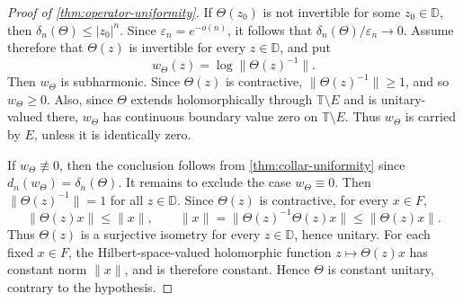 \documentclass[11pt]{amsart}
\numberwithin{equation}{section}
\theoremstyle{definition}
\newcommand{\D}{\mathbb D}
\newcommand{\T}{\mathbb T}
\newcommand{\eps}{\varepsilon}
\begin{document}
\begin{proof}[Proof of \cref{thm:operator-uniformity}]
If $\Theta(z_0)$ is not invertible for some $z_0\in\D$, then
$\delta_n(\Theta)\le |z_0|^n$.  Since $\eps_n=e^{-o(n)}$, it follows that
$\delta_n(\Theta)/\eps_n\to0$.
Assume therefore that $\Theta(z)$ is invertible for every $z\in\D$, and
put
$$
        w_\Theta(z)=\log\|\Theta(z)^{-1}\|.
$$
Then $w_\Theta$ is subharmonic.  Since $\Theta(z)$ is contractive,
$\|\Theta(z)^{-1}\|\ge1$, and so $w_\Theta\ge0$.  Also, since $\Theta$
extends holomorphically through $\T\setminus E$ and is unitary-valued there,
$w_\Theta$ has continuous boundary value zero on $\T\setminus E$.  Thus
$w_\Theta$ is carried by $E$, unless it is identically zero.

If $w_\Theta\not\equiv0$, then the conclusion follows from \cref{thm:collar-uniformity} since $d_n(w_\Theta)=\delta_n(\Theta)$.
It remains to exclude the case $w_\Theta\equiv0$.  Then
$\|\Theta(z)^{-1}\|=1$ for all $z\in\D$.  Since $\Theta(z)$ is
contractive, for every $x\in F$,
$$
        \|\Theta(z)x\|\le\|x\|,
        \qquad
        \|x\|=\|\Theta(z)^{-1}\Theta(z)x\|
        \le \|\Theta(z)x\|.
$$
Thus $\Theta(z)$ is a surjective isometry for every $z\in\D$, hence
unitary.  For each fixed $x\in F$, the Hilbert-space-valued holomorphic
function $z\mapsto\Theta(z)x$ has constant norm $\|x\|$, and is therefore
constant.  Hence $\Theta$ is constant unitary, contrary to the hypothesis.
\end{proof}

\end{document}
